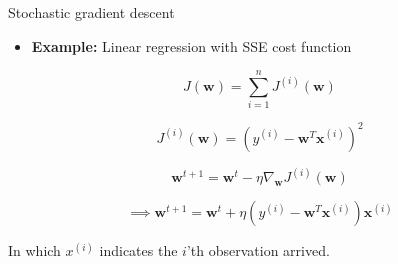 \documentclass[serif, aspectratio=169]{beamer}
\begin{document}
    \begin{frame}{Stochastic gradient descent}

        \begin{itemize}
            \item \textbf{Example:} Linear regression with SSE cost function
        \end{itemize}
        \[
            J(\mathbf{w}) = \sum_{i=1}^{n} J^{(i)}(\mathbf{w})
        \]

        \[
            J^{(i)}(\mathbf{w}) = \left( y^{(i)} - \mathbf{w}^T \mathbf{x}^{(i)} \right)^2
        \]

        \[
            \mathbf{w}^{t+1} = \mathbf{w}^t - \eta \nabla_{\mathbf{w}} J^{(i)}(\mathbf{w})
        \]

        \[
            \implies \mathbf{w}^{t+1} = \mathbf{w}^t + \eta \left( y^{(i)} - \mathbf{w}^T \mathbf{x}^{(i)} \right) \mathbf{x}^{(i)}
        \]

        \begin{center}
            In which \( x^{(i)} \) indicates the \(i\)'th observation arrived.
        \end{center}

    \end{frame}


\end{document}
